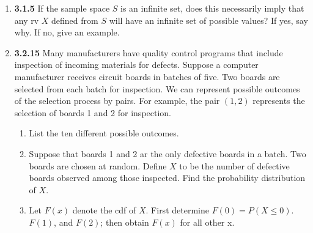 \documentclass[12pt]{article}
\begin{document}
\begin{enumerate}
\newpage

\item \textbf{3.1.5} If the sample space $S$ is an infinite set, does this necessarily imply that any rv $X$ defined from $S$ will have an infinite set of possible values? If yes, say why. If no, give an example.


\newpage

\item \textbf{3.2.15} Many manufacturers have quality control programs that include inspection of incoming materials for defects. Suppose a computer manufacturer receives circuit boards in batches of five. Two boards are selected from each batch for inspection. We can represent possible outcomes of the selection process by pairs. For example, the pair $(1, 2)$ represents the selection of boards 1 and 2 for inspection.
  \begin{enumerate}
  \item List the ten different possible outcomes.
  \item Suppose that boards 1 and 2 ar the only defective boards in a batch. Two boards are chosen at random. Define $X$ to be the number of defective boards observed among those inspected. Find the probability distribution of $X$.
  \item Let $F(x)$ denote the cdf of $X$. First determine $F(0) = P(X\leq0)$. $F(1)$, and $F(2)$; then obtain $F(x)$ for all other x.
  \end{enumerate}

\end{enumerate}
\end{document}
